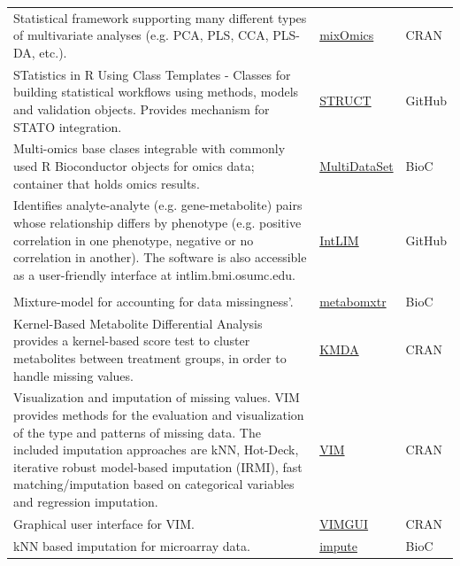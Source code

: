 \documentclass[]{article}
\begin{document}
\begin{longtable}{>{\raggedright\arraybackslash}p{30em}>{\raggedright\arraybackslash}p{10em}>{\raggedright\arraybackslash}p{3em}}
\rowcolor{gray!6}  Statistical framework supporting many different types of multivariate analyses (e.g. PCA, PLS, CCA, PLS-DA, etc.). & \href{https://cran.r-project.org/web/packages/mixOmics/index.html}{mixOmics} & CRAN\\
STatistics in R Using Class Templates - Classes for building statistical workflows using methods, models and validation objects. Provides mechanism for STATO integration. & \href{http://www.github.com/computational-metabolomics/struct}{STRUCT} & GitHub\\
\rowcolor{gray!6}  Multi-omics base clases integrable with commonly used R Bioconductor objects for omics data; container that holds omics results. & \href{https://bioconductor.org/packages/release/bioc/html/MultiDataSet.html}{MultiDataSet} & BioC\\
Identifies analyte-analyte (e.g. gene-metabolite) pairs whose relationship differs by phenotype (e.g. positive correlation in one phenotype, negative or no correlation in another). The software is also accessible as a user-friendly interface at intlim.bmi.osumc.edu. & \href{https://github.com/mathelab/IntLIM}{IntLIM} & GitHub\\
\rowcolor{gray!6}  \addlinespace[0.3em]
\multicolumn{3}{l}{\textbf{Missing value imputation}}\\
Mixture-model for accounting for data missingness'. & \href{https://doi.org/doi:10.18129/B9.bioc.metabomxtr}{metabomxtr} & BioC\\
Kernel-Based Metabolite Differential Analysis provides a kernel-based score test to cluster metabolites between treatment groups, in order to handle missing values. & \href{https://cran.r-project.org/web/packages/KMDA/}{KMDA} & CRAN\\
\rowcolor{gray!6}  Visualization and imputation of missing values. VIM provides methods for the evaluation and visualization of the type and patterns of missing data. The included imputation approaches are kNN, Hot-Deck, iterative robust model-based imputation (IRMI), fast matching/imputation based on categorical variables and regression imputation. & \href{https://cran.r-project.org/web/packages/VIM/index.html}{VIM} & CRAN\\
Graphical user interface for VIM. & \href{https://cran.r-project.org/web/packages/VIMGUI/VIMGUI.pdf}{VIMGUI} & CRAN\\
\rowcolor{gray!6}  kNN based imputation for microarray data. & \href{https://www.bioconductor.org/packages//2.10/bioc/html/impute.html}{impute} & BioC\\

\end{longtable}
\end{document}

